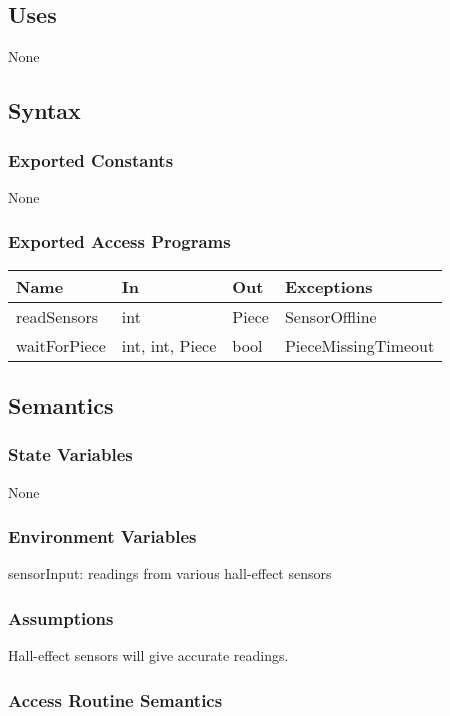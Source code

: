 \documentclass[12pt, titlepage]{article}
\begin{document}
\subsection{Uses}{
  None
}

\subsection{Syntax}

\subsubsection{Exported Constants}{
  None
}

\subsubsection{Exported Access Programs}{
  \begin{center}
  \begin{tabular}{p{4cm} p{3cm} p{2cm} p{4cm}}
  \hline
  \textbf{Name} & \textbf{In} & \textbf{Out} & \textbf{Exceptions} \\
  \hline
  readSensors & {int} & Piece & SensorOffline \\
  \midrule
  waitForPiece & {int, int, Piece} & bool & PieceMissingTimeout \\
  \hline
  \end{tabular}
  \end{center}
}

\subsection{Semantics}

\subsubsection{State Variables}{
  None
}

\subsubsection{Environment Variables}{
  sensorInput: readings from various hall-effect sensors
}

\subsubsection{Assumptions}{
  Hall-effect sensors will give accurate readings.
}

\subsubsection{Access Routine Semantics}
\end{document}
